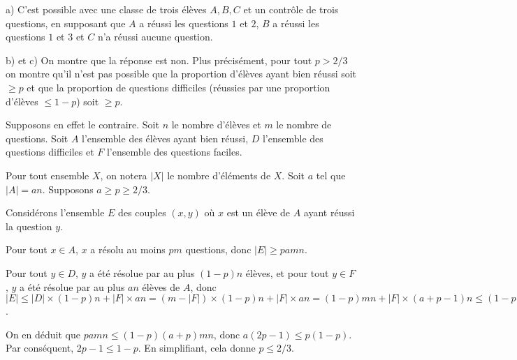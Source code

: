 \begin{sol}
 a) C'est possible avec une classe de trois \'el\`eves $A,B,C$ et un contr\^ole de trois questions, en supposant que $A$ a r\'eussi les questions $1$ et $2$, $B$ a r\'eussi les questions $1$ et $3$ et $C$ n'a r\'eussi aucune question.

 b) et c) On montre que la r\'eponse est non. Plus pr\'ecis\'ement, pour tout $p>2/3$ on
montre qu'il n'est pas possible que la proportion d'\'el\`eves ayant bien r\'eussi soit $\geqslant p$ et que la proportion de questions difficiles (r\'eussies par une proportion d'\'el\`eves
$\leqslant 1-p$) soit $\geqslant p$.

Supposons en effet le contraire. Soit $n$ le nombre d'\'el\`eves et $m$ le nombre de questions. Soit $A$ l'ensemble des \'el\`eves ayant bien r\'eussi,
$D$ l'ensemble des questions difficiles et $F$ l'ensemble des questions faciles.

Pour tout ensemble $X$, on notera $|X|$ le nombre d'\'el\'ements de $X$. Soit $a$ tel que $|A|=an$. Supposons $a\geqslant p\geqslant 2/3$.


Consid\'erons l'ensemble $E$ des couples $(x,y)$ o\`u $x$ est un \'el\`eve de $A$ ayant r\'eussi la question $y$. 

Pour tout $x\in A$, $x$ a r\'esolu au moins $pm$ questions, donc $|E|\geqslant pamn$.

Pour tout $y\in D$, $y$ a \'et\'e r\'esolue par au plus $(1-p)n$ \'el\`eves, et pour tout $y\in F$, $y$ a \'et\'e r\'esolue par au plus $an$ \'el\`eves de $A$, donc $|E|\leqslant |D|\times (1-p)n+ |F|\times an =(m-|F|)\times (1-p)n+|F|\times an=(1-p)mn+|F|\times (a+p-1)n\leqslant (1-p)(a+p)mn$.

On en d\'eduit que $pamn\leqslant (1-p)(a+p)mn$, donc $a(2p-1)\leqslant p(1-p)$. Par cons\'equent, $2p-1\leqslant 1-p$. En simplifiant,
cela donne $p\leqslant 2/3$.
\end{sol}
